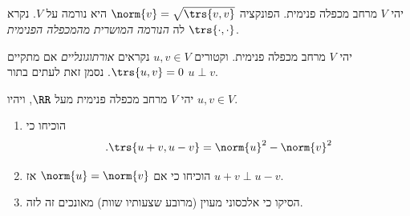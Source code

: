 \documentclass[a4paper,10pt,twoside,openany]{book}
\begin{document}
\begin{theorem}
יהי
$V$
מרחב מכפלה פנימית.
הפונקציה
$\norm{v} = \sqrt{\trs{v,v}}$
היא נורמה על
$V$.
נקרא לה
\emph{הנורמה המושרית מהמכפלה הפנימית
$\trs{\cdot,\cdot}$}.
\end{theorem}

\begin{definition}
יהי
$V$
מרחב מכפלה פנימית.
וקטורים
$u,v \in V$
נקראים
\emph{אורתוגונליים}
אם
מתקיים
$\trs{u,v} = 0$.
נסמן זאת לעתים בתור
$u \perp v$.
\end{definition}

\begin{exercisechap}
יהי
$V$
מרחב מכפלה פנימית מעל
$\RR$,
ויהיו
$u,v \in V$.
\begin{enumerate}
\item הוכיחו כי
\[\text{.} \trs{u+v, u-v} = \norm{u}^2 - \norm{v}^2\]
\item הוכיחו כי אם
$\norm{u} = \norm{v}$
אז
$u+v \perp u-v$.
\item  הסיקו כי אלכסוני מעוין (מרובע שצעותיו שוות) מאונכים זה לזה.
\end{enumerate}
\end{exercisechap}
\end{document}
